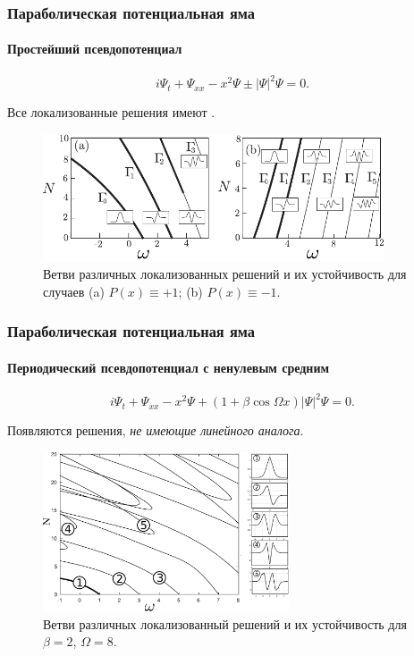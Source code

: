 \documentclass [10pt] {beamer}
\begin{document}
\begin{frame}
	\frametitle{Параболическая потенциальная яма}
	\framesubtitle{Простейший псевдопотенциал\footnotemark[7]}
	
	\begin{equation}
		i \Psi_t + \Psi_{xx} - x^2 \Psi \pm |\Psi|^2 \Psi = 0.
	\end{equation}
	
	Все локализованные решения имеют {\it {}}.
	
	\begin{figure}
		\includegraphics[width=0.9\textwidth]{pic/solution_branches_simple.pdf}
		\caption{Ветви различных локализованных решений и их устойчивость для случаев {\color{ceruleanblue} (a)} $P(x) \equiv +1$; {\color{ceruleanblue} (b)} $P(x) \equiv -1$.}
		\label{pic:branches_simple}
	\end{figure}
	
\end{frame}

\begin{frame}
	\frametitle{Параболическая потенциальная яма}
	\framesubtitle{Периодический псевдопотенциал с ненулевым средним}
	
	\begin{equation}
		i \Psi_t + \Psi_{xx} - x^2 \Psi + (1 + \beta \cos \Omega x) |\Psi|^2 \Psi = 0.
	\end{equation}

	Появляются решения, {\it не имеющие линейного аналога}.

	\begin{figure}
		\includegraphics[width=0.65\textwidth]{pic/solution_branches_nonzero_mean.pdf}
		\caption{Ветви различных локализованный решений и их устойчивость для $\beta = 2$, $\Omega = 8$.}
		\label{pic:branches_nonzero_mean}
	\end{figure}	
	
\end{frame}
\end{document}
